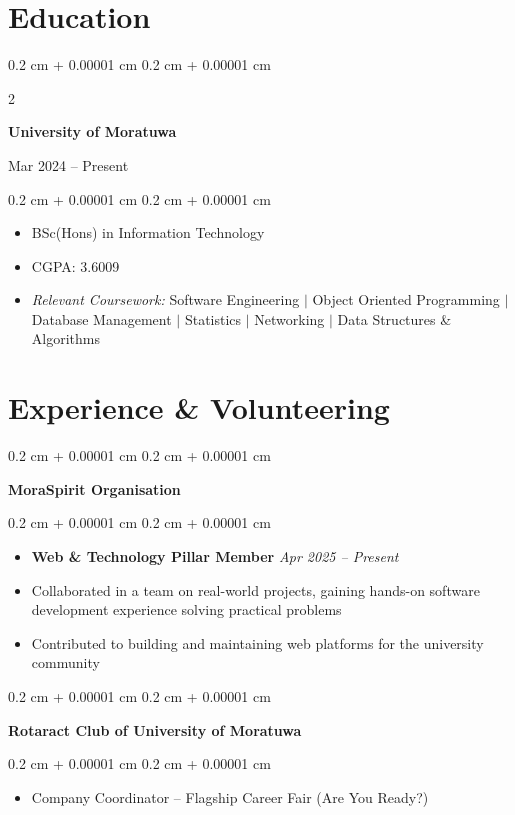\documentclass[10pt, letterpaper]{article}
\newenvironment{highlights}{
	\vspace{0.05 cm}
	\begin{itemize}[
		topsep=0.10 cm,
		parsep=0.10 cm,
		partopsep=0pt,
		itemsep=0pt,
		leftmargin=0.4 cm + 10pt
		]
	}{
	\end{itemize}
}
\newenvironment{onecolentry}{
	\begin{adjustwidth}{
			0.2 cm + 0.00001 cm
		}{
			0.2 cm + 0.00001 cm
		}
	}{
	\end{adjustwidth}
}
\newenvironment{twocolentry}[2][]{
	\onecolentry
	\def\secondColumn{#2}
	\setcolumnwidth{\fill, 4.5 cm}
	\begin{paracol}{2}
	}{
		\switchcolumn \raggedleft \secondColumn
	\end{paracol}
	\endonecolentry
}
\begin{document}
	\section{Education}

	\begin{twocolentry}{
		Mar 2024 -- Present
	}
		\textbf{University of Moratuwa}
	\end{twocolentry}
	\vspace{0.10 cm}
	\begin{onecolentry}
		\begin{highlights}
			\item BSc(Hons) in Information Technology
			\item CGPA: 3.6009
			\item \textit{Relevant Coursework:} Software Engineering $|$ Object Oriented Programming $|$ Database Management $|$ Statistics $|$ Networking $|$ Data Structures \& Algorithms
		\end{highlights}
	\end{onecolentry}


	\section{Experience \& Volunteering}

	\begin{onecolentry}
		\textbf{MoraSpirit Organisation}
	\end{onecolentry}
	\begin{onecolentry}
		\begin{highlights}
			\item \textbf{Web \& Technology Pillar Member} \hfill \textit{Apr 2025 -- Present}
			\item Collaborated in a team on real-world projects, gaining hands-on software development experience solving practical problems
			\item Contributed to building and maintaining web platforms for the university community
		\end{highlights}
	\end{onecolentry}

	\vspace{0.25 cm}

	\begin{onecolentry}
		\textbf{Rotaract Club of University of Moratuwa}
	\end{onecolentry}
	\begin{onecolentry}
		\begin{highlights}
			\item Company Coordinator -- Flagship Career Fair (Are You Ready?)
		\end{highlights}
	\end{onecolentry}
\end{document}
